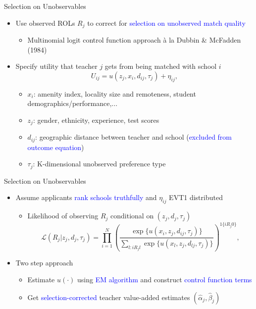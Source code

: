 \documentclass[compress,10pt,aspectratio=169]{beamer}
\newcommand\emphblue[1]{\textcolor{blue}{#1}}
\begin{document}
\begin{frame}{Selection on Unobservables}
    \begin{itemize}
        \item Use observed ROLs $R_j$ to correct for \emphblue{selection on unobserved match quality}
        \begin{itemize}
        \smallskip
            \item[$\Rightarrow$] Multinomial logit control function approach à la Dubbin \& McFadden (1984)
        \end{itemize}
        \bigskip
        \item Specify utility that teacher $j$ gets from being matched with school $i$
        $$
        U_{ij} =u(z_j,x_i,d_{ij},\tau_j)  + \eta_{ij},
        $$
        \begin{itemize}
            \item[$\Rightarrow$] $x_i$: amenity index, locality size and remoteness, student demographics/performance,...
            \medskip
            \item[$\Rightarrow$] $z_j$: gender, ethnicity, experience, test scores
            \medskip
            \item[$\Rightarrow$] $d_{ij}$: geographic distance between teacher and school (\emphblue{excluded from outcome equation})
            \medskip
            \item[$\Rightarrow$] $\tau_j$: K-dimensional unobserved preference type
        \end{itemize}
    \end{itemize}
\end{frame}



\begin{frame}{Selection on Unobservables}
    \begin{itemize}
        \item Assume applicants \emphblue{rank schools truthfully} and $\eta_{ij}$ EVT1 distributed
        \begin{itemize}
        \smallskip
        \item[$\Rightarrow$] Likelihood of observing $R_j$ conditional on $(z_j,d_j,\tau_j)$
        $$
        \mathcal{L}(R_j|z_j,d_j,\tau_j)=\prod_{i=1}^N\left(\frac{\exp\{u(x_i,z_{j},d_{ij},\tau_j)\}}{\sum_{l: iR_{j}l}\exp\{u(x_l,z_{j},d_{lj},\tau_j)\}}\right)^{1\{iR_{j}0\}},
        $$
        \end{itemize}
        \bigskip
        \item Two step approach
        \begin{itemize}
        \smallskip
            \item[$\Rightarrow$] Estimate $u(\cdot)$ using \emphblue{EM algorithm} and construct \emphblue{control function terms}
            \medskip
            \item[$\Rightarrow$] Get \emphblue{selection-corrected} teacher value-added estimates $(\hat{\alpha}_j,\hat{\beta}_j)$
        \end{itemize}
    \end{itemize}
\end{frame}
\end{document}
